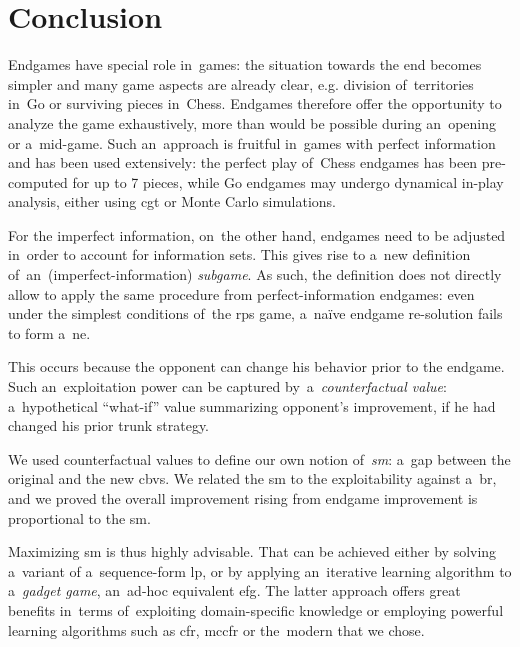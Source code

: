 \chapter*{Conclusion}
Endgames have special role in~games:
the situation towards the end becomes simpler and many game aspects are already clear, e.g. division of~territories in~Go or surviving pieces in~Chess.
Endgames therefore offer the opportunity to analyze the game exhaustively, more than would be possible during an~opening or a~mid-game.
Such an~approach is fruitful in~games with perfect information and has been used extensively:
the perfect play of~Chess endgames has been pre-computed for up to 7 pieces, while Go endgames may undergo dynamical in-play analysis, either using \acrlong{cgt} or Monte Carlo simulations.

For the imperfect information, on~the other hand, endgames need to be adjusted in~order to account for information sets.
This gives rise to a~new definition of~an~(imperfect-information) \emph{subgame}.
As such, the definition does not directly allow to apply the same procedure from perfect-information endgames:
even under the simplest conditions of~the \acrlong{rps} game, a~na{\"i}ve endgame re-solution fails to form a~\acrlong{ne}.

This occurs because the opponent can change his behavior prior to the endgame.
Such an~exploitation power can be captured by~a~\emph{counterfactual value}:
a~hypothetical ``what-if'' value summarizing opponent's improvement, if he had changed his prior trunk strategy.

We used counterfactual values to define our own notion of~\emph{\acrlong{sm}}:
a~gap between the original and the new \acrlong{cbv}s.
We related the \acrshort{sm} to the exploitability against a~\acrlong{br}, and we proved the overall improvement rising from endgame improvement is proportional to the \acrshort{sm}.

Maximizing \acrshort{sm} is thus highly advisable.
That can be achieved either by solving a~variant of a~sequence-form \acrlong{lp}, or by applying an~iterative learning algorithm to a~\emph{gadget game}, an~ad-hoc equivalent \acrlong{efg}.
The latter approach offers great benefits in~terms of~exploiting domain-specific knowledge or employing powerful learning algorithms such as \acrshort{cfr}, \acrshort{mccfr} or the~modern \cfrplus{} that we chose.
